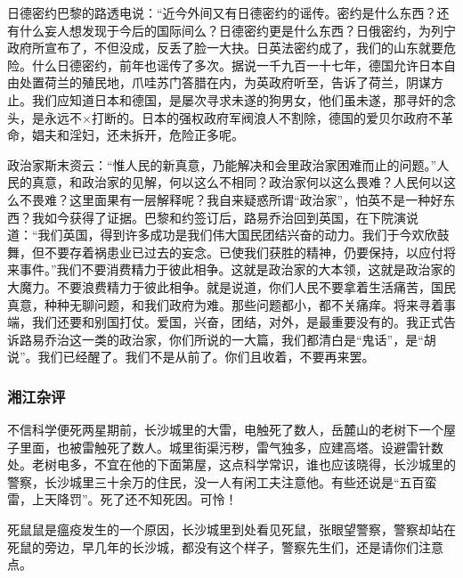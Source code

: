 日德密约巴黎的路透电说：“近今外间又有日德密约的谣传。密约是什么东西？还有什么妄人想发现于今后的国际间么？日德密约更是什么东西？日俄密约，为列宁政府所宣布了，不但没成，反丢了脸一大抉。日英法密约成了，我们的山东就要危险。什么日德密约，前年也谣传了多次。据说一千九百一十七年，德国允许日本自由处置荷兰的殖民地，爪哇苏门答腊在内，为英政府听至，告诉了荷兰，阴谋方止。我们应知道日本和德国，是屡次寻求未遂的狗男女，他们虽未遂，那寻奸的念头，是永远不×打断的。日本的强权政府军阀浪人不割除，德国的爱贝尔政府不革命，娼夫和淫妇，还未拆开，危险正多呢。

政治家斯末资云：“惟人民的新真意，乃能解决和会里政治家困难而止的问题。”人民的真意，和政治家的见解，何以这么不相同？政治家何以这么畏难？人民何以这么不畏难？这里面果有一层解释呢？我自来疑惑所谓“政治家”，怕英不是一种好东西？我如今获得了证据。巴黎和约签订后，路易乔治回到英国，在下院演说道：“我们英国，得到许多成功是我们伟大国民团结兴奋的动力。我们于今欢欣鼓舞，但不要存着祸患业已过去的妄念。已使我们获胜的精神，仍要保持，以应付将来事件。”我们不要消费精力于彼此相争。这就是政治家的大本领，这就是政治家的大魔力。不要浪费精力于彼此相争。就是说道，你们人民不要拿着生活痛苦，国民真意，种种无聊问题，和我们政府为难。那些问题都小，都不关痛痒。将来寻着事端，我们还要和别国打仗。爱国，兴奋，团结，对外，是最重要没有的。我正式告诉路易乔治这一类的政治家，你们所说的一大篇，我们都清白是“鬼话”，是“胡说”。我们已经醒了。我们不是从前了。你们且收着，不要再来罢。

\subsubsection{湘江杂评}

不信科学便死两星期前，长沙城里的大雷，电触死了数人，岳麓山的老树下一个屋子里面，也被雷触死了数人。城里街渠污秽，雷气独多，应建高塔。设避雷针数处。老树电多，不宜在他的下面第屋，这点科学常识，谁也应该晓得，长沙城里的警察，长沙城里三十余万的住民，没一人有闲工夫注意他。有些还说是“五百蛮雷，上天降罚”。死了还不知死因。可怜！

死鼠鼠是瘟疫发生的一个原因，长沙城里到处看见死鼠，张眼望警察，警察却站在死鼠的旁边，早几年的长沙城，都没有这个样子，警察先生们，还是请你们注意点。
